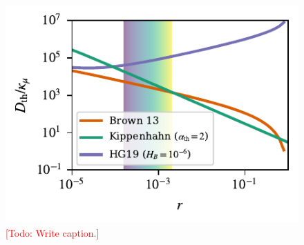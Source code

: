 \begin{figure}
    \centering
    \includegraphics[width=\columnwidth]{Nu_models_comparison.pdf}
    \caption{\textcolor{red}{[Todo: Write caption.]}}
    \label{fig:parameterization_compare}
\end{figure}
